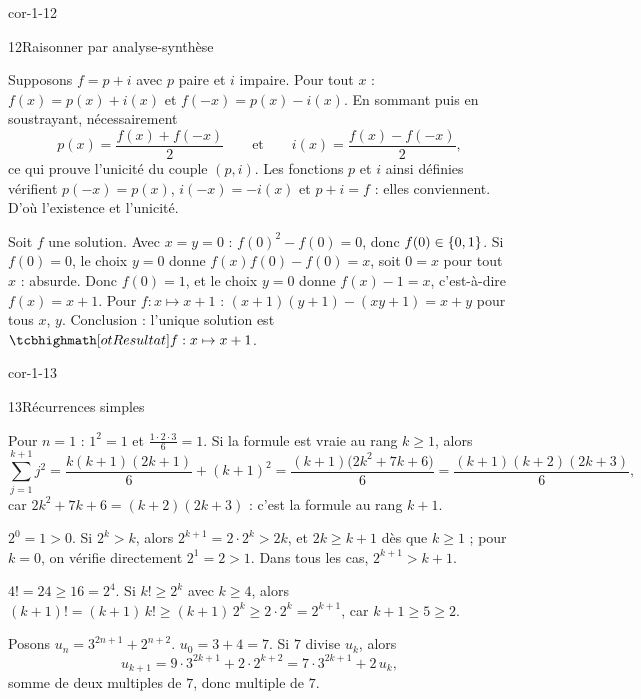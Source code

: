 \begin{blocLivre}{cor-1-12}
\begin{corrige}{12}{Raisonner par analyse-synthèse}
\begin{questions}
  \item {} Supposons $f=p+i$ avec $p$ paire et $i$ impaire. Pour tout $x$ :
    $f(x)=p(x)+i(x)$ et $f(-x)=p(x)-i(x)$. En sommant puis en soustrayant, nécessairement
    \[p(x)=\frac{f(x)+f(-x)}{2}\qquad\text{et}\qquad i(x)=\frac{f(x)-f(-x)}{2},\]
    ce qui prouve l'unicité du couple $(p,i)$.
     Les fonctions $p$ et $i$ ainsi définies vérifient $p(-x)=p(x)$, $i(-x)=-i(x)$ et
    $p+i=f$ : elles conviennent. D'où l'existence et l'unicité.
  \item {} Soit $f$ une solution. Avec $x=y=0$ : $f(0)^{2}-f(0)=0$, donc
    $f(0)\in\left\{0,1\right\}$. Si $f(0)=0$, le choix $y=0$ donne $f(x)f(0)-f(0)=x$, soit $0=x$ pour tout
    $x$ : absurde. Donc $f(0)=1$, et le choix $y=0$ donne $f(x)-1=x$, c'est-à-dire $f(x)=x+1$.
     Pour $f:x\mapsto x+1$ : $(x+1)(y+1)-(xy+1)=x+y$ pour tous $x$, $y$.
    Conclusion : l'unique solution est $\res{f:x\mapsto x+1}$.
\end{questions}
\end{corrige}
\end{blocLivre}

\begin{blocLivre}{cor-1-13}
\begin{corrige}{13}{Récurrences simples}
\begin{questions}
  \item {} Pour $n=1$ : $1^{2}=1$ et $\frac{1\cdot2\cdot3}{6}=1$.
     Si la formule est vraie au rang $k\geq1$, alors
    \[\sum_{j=1}^{k+1}j^{2}=\frac{k(k+1)(2k+1)}{6}+(k+1)^{2}=\frac{(k+1)\bigl(2k^{2}+7k+6\bigr)}{6}
      =\frac{(k+1)(k+2)(2k+3)}{6},\]
    car $2k^{2}+7k+6=(k+2)(2k+3)$ : c'est la formule au rang $k+1$.
  \item {} $2^{0}=1>0$.\quad
     Si $2^{k}>k$, alors $2^{k+1}=2\cdot2^{k}>2k$, et $2k\geq k+1$ dès que $k\geq1$ ;
    pour $k=0$, on vérifie directement $2^{1}=2>1$. Dans tous les cas, $2^{k+1}>k+1$.
  \item {} $4!=24\geq16=2^{4}$.\quad
     Si $k!\geq2^{k}$ avec $k\geq4$, alors
    $(k+1)!=(k+1)\,k!\geq(k+1)\,2^{k}\geq2\cdot2^{k}=2^{k+1}$, car $k+1\geq5\geq2$.
  \item Posons $u_n=3^{2n+1}+2^{n+2}$.\quad
     $u_0=3+4=7$.\quad
     Si $7$ divise $u_k$, alors
    \[u_{k+1}=9\cdot3^{2k+1}+2\cdot2^{k+2}=7\cdot3^{2k+1}+2\,u_k,\]
    somme de deux multiples de $7$, donc multiple de $7$.
\end{questions}
\end{corrige}
\end{blocLivre}

